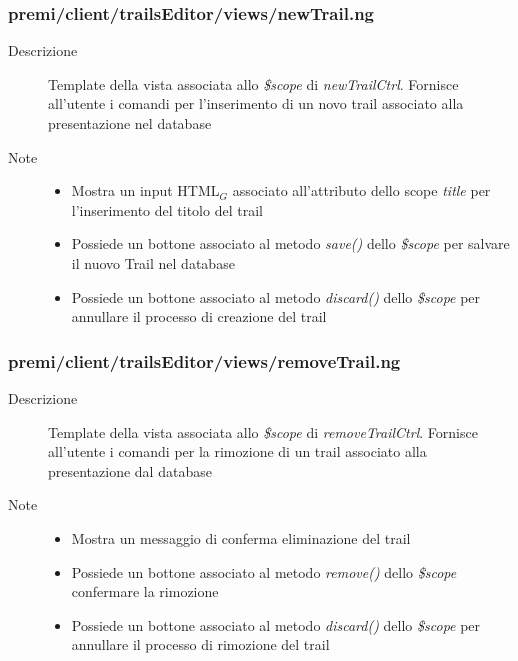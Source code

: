 \subsubsection{premi/client/trailsEditor/views/newTrail.ng}

\begin{description}
\item[Descrizione] \hfill
	Template della vista associata allo \textit{\$scope} di \textit{newTrailCtrl}. Fornisce all'utente i comandi per l'inserimento di un novo trail associato alla presentazione nel database
\item[Note] \hfill
	\begin{itemize}
			\item Mostra un input HTML$_G$ associato all'attributo dello scope \textit{title} per l'inserimento del titolo del trail
			\item Possiede un bottone associato al metodo \textit{save()} dello \textit{\$scope} per salvare il nuovo Trail nel database
			\item Possiede un bottone associato al metodo \textit{discard()} dello \textit{\$scope} per annullare il processo di creazione del trail
	\end{itemize}
\end{description}

\subsubsection{premi/client/trailsEditor/views/removeTrail.ng}

\begin{description}
\item[Descrizione] \hfill
	Template della vista associata allo \textit{\$scope} di \textit{removeTrailCtrl}. Fornisce all'utente i comandi per la rimozione di un trail associato alla presentazione dal database
\item[Note] \hfill
	\begin{itemize}
			\item Mostra un messaggio di conferma eliminazione del trail
			\item Possiede un bottone associato al metodo \textit{remove()} dello \textit{\$scope} confermare la rimozione
			\item Possiede un bottone associato al metodo \textit{discard()} dello \textit{\$scope} per annullare il processo di rimozione del trail
	\end{itemize}
\end{description}

































